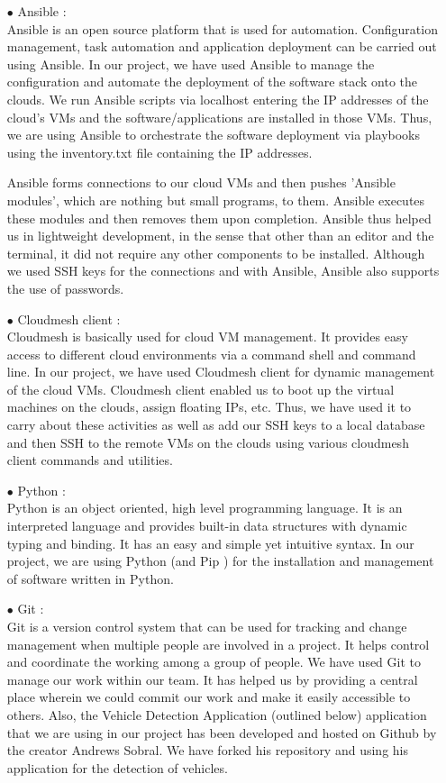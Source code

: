 \documentclass[9pt,twocolumn,twoside]{../../styles/osajnl}
\begin{document}
\begin{itemize}

\item[$\bullet$] Ansible \cite{Ansible}: \\
Ansible is an open source platform that is used for automation.
Configuration management, task automation and application deployment
can be carried out using Ansible.  In our project, we have used
Ansible to manage the configuration and automate the deployment of the
software stack onto the clouds.  We run Ansible scripts via localhost
entering the IP addresses of the cloud's VMs and
the software/applications are installed in those VMs.  Thus, we are
using Ansible to orchestrate the software deployment via playbooks
using the inventory.txt file containing the IP addresses.

Ansible forms connections to our cloud VMs and then pushes 'Ansible
modules', which are nothing but small programs, to them.  Ansible
executes these modules and then removes them upon completion.  Ansible
thus helped us in lightweight development, in the sense that other
than an editor and the terminal, it did not require any other
components to be installed.  Although we used SSH keys for the
connections and with Ansible, Ansible also supports the use of
passwords.

\item[$\bullet$] Cloudmesh client \cite{github-cloudmesh-client}: \\
Cloudmesh is basically used for cloud VM management.  It provides
easy access to different cloud environments via a command shell and
command line.  In our project, we have used Cloudmesh client for
dynamic management of the cloud VMs.  Cloudmesh client enabled us to boot up the virtual machines on the clouds, assign floating IPs, etc.  Thus, we have used it to carry about these activities as well as add
our SSH keys to a local database and then SSH to the remote VMs on
the clouds using various cloudmesh client commands and utilities.  

\item[$\bullet$] Python \cite{Python}: \\
Python is an object oriented, high level programming language.  It is
an interpreted language and provides built-in data structures with
dynamic typing and binding.  It has an easy and simple yet intuitive
syntax.  In our project, we are using Python (and Pip \cite{Pip}) for
the installation and management of software written in Python.

\item[$\bullet$] Git \cite{Git}: \\
Git is a version control system that can be used for tracking and
change management when multiple people are involved in a project.  It
helps control and coordinate the working among a group of people.  We
have used Git to manage our work within our team.  It has helped us by
providing a central place wherein we could commit our work and make it
easily accessible to others.  Also, the Vehicle Detection Application
(outlined below) application that we are using in our project has been
developed and hosted on Github by the creator Andrews Sobral.  We have
forked his repository and using his application for the detection of
vehicles.


\end{itemize}
\end{document}
